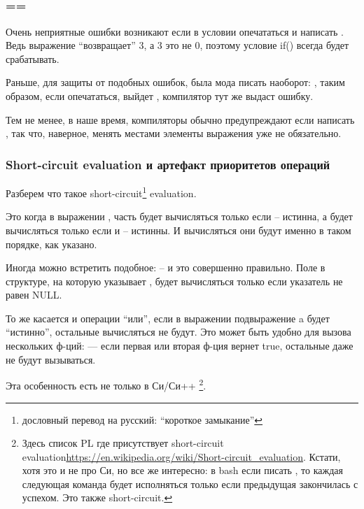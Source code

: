 ﻿\subsection{}

\subsubsection{==}

Очень неприятные ошибки возникают если в условии  опечататься и написать .
Ведь выражение  ``возвращает'' 3, а 3 это не 0, поэтому условие if() всегда будет 
срабатывать.

Раньше, для защиты от подобных ошибок, была мода писать наоборот: , таким образом,
если опечататься, выйдет , компилятор тут же выдаст ошибку.

Тем не менее, в наше время, компиляторы обычно предупреждают если написать , 
так что, наверное, менять местами элементы выражения уже не обязательно.

\subsubsection{Short-circuit evaluation и артефакт приоритетов операций}

Разберем что такое short-circuit\footnote{дословный перевод на русский: ``короткое замыкание''} evaluation.

Это когда в выражении , часть  будет вычисляться только если  -- истинна,
а  будет вычисляться
только если  и  -- истинны. И вычисляться они будут именно в таком порядке, как указано.

Иногда можно встретить подобное:  -- и это совершенно правильно.
Поле  в структуре,
на которую указывает , будет вычисляться только если указатель  не равен NULL.

То же касается и операции ``или'', если в выражении  подвыражение a будет ``истинно'',
остальные вычисляться не будут. Это может быть удобно для вызова нескольких ф-ций: 
 --- если первая или вторая ф-ция вернет true, 
остальные даже не будут вызываться.

Эта особенность есть не только в Си/Си++
\footnote{Здесь список \ac{PL} где присутствует short-circuit evaluation\url{https://en.wikipedia.org/wiki/Short-circuit_evaluation}. Кстати, хотя это и не про Си, но все же интересно: в bash если писать , то каждая следующая команда будет исполняться только если предыдущая закончилась с успехом. Это также short-circuit.}.

